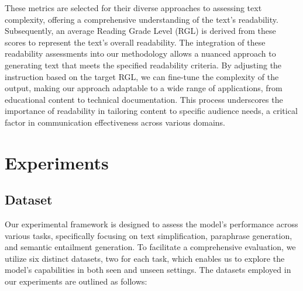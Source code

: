 \documentclass[11pt]{article}
\begin{document}
These metrics are selected for their diverse approaches to assessing text complexity, offering a comprehensive understanding of the text's readability. Subsequently, an average Reading Grade Level (RGL) is derived from these scores to represent the text's overall readability. The integration of these readability assessments into our methodology allows a nuanced approach to generating text that meets the specified readability criteria. By adjusting the instruction based on the target RGL, we can fine-tune the complexity of the output, making our approach adaptable to a wide range of applications, from educational content to technical documentation. This process underscores the importance of readability in tailoring content to specific audience needs, a critical factor in communication effectiveness across various domains.


\section{Experiments}

\subsection{Dataset}
Our experimental framework is designed to assess the model's performance across various tasks, specifically focusing on text simplification, paraphrase generation, and semantic entailment generation. To facilitate a comprehensive evaluation, we utilize six distinct datasets, two for each task, which enables us to explore the model's capabilities in both seen and unseen settings. The datasets employed in our experiments are outlined as follows:
\end{document}
